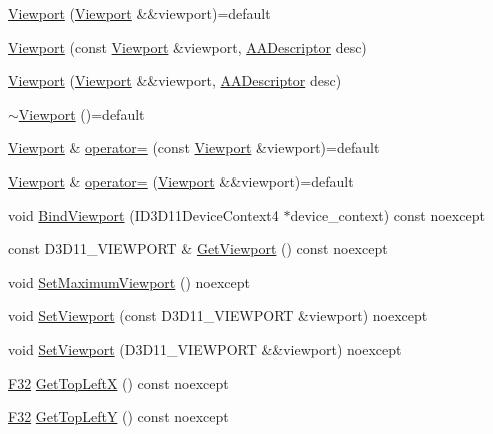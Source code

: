 \begin{DoxyCompactItemize}
\item 
\hyperlink{classmage_1_1_viewport_a314686e3b925a4158418a98ba28c4fc6}{Viewport} (\hyperlink{classmage_1_1_viewport}{Viewport} \&\&viewport)=default
\item 
\hyperlink{classmage_1_1_viewport_a31a85c06722097bf1bc0e6ead39e2e8d}{Viewport} (const \hyperlink{classmage_1_1_viewport}{Viewport} \&viewport, \hyperlink{namespacemage_a86cd40b8f2f42ca4d616cc6ec665a7f2}{A\+A\+Descriptor} desc)
\item 
\hyperlink{classmage_1_1_viewport_a61d8b17ff42b3d78d3b5e9eebff13496}{Viewport} (\hyperlink{classmage_1_1_viewport}{Viewport} \&\&viewport, \hyperlink{namespacemage_a86cd40b8f2f42ca4d616cc6ec665a7f2}{A\+A\+Descriptor} desc)
\item 
\hyperlink{classmage_1_1_viewport_a6fcf68e154b186d5c6241c495cc93fe5}{$\sim$\+Viewport} ()=default
\item 
\hyperlink{classmage_1_1_viewport}{Viewport} \& \hyperlink{classmage_1_1_viewport_ab06320c545dd9b71d17e7f8c92fb693c}{operator=} (const \hyperlink{classmage_1_1_viewport}{Viewport} \&viewport)=default
\item 
\hyperlink{classmage_1_1_viewport}{Viewport} \& \hyperlink{classmage_1_1_viewport_a83ef22f5db0991bc540372d37905524d}{operator=} (\hyperlink{classmage_1_1_viewport}{Viewport} \&\&viewport)=default
\item 
void \hyperlink{classmage_1_1_viewport_a363d750cdb8c21ee5b3e68a323f914db}{Bind\+Viewport} (I\+D3\+D11\+Device\+Context4 $\ast$device\+\_\+context) const noexcept
\item 
const D3\+D11\+\_\+\+V\+I\+E\+W\+P\+O\+RT \& \hyperlink{classmage_1_1_viewport_ad4bb75cdfbd137182898caad913de4d1}{Get\+Viewport} () const noexcept
\item 
void \hyperlink{classmage_1_1_viewport_a5af006b8ec0464a924c3822265727ee2}{Set\+Maximum\+Viewport} () noexcept
\item 
void \hyperlink{classmage_1_1_viewport_a12a0d7b74ce81786e38f08d399acafc6}{Set\+Viewport} (const D3\+D11\+\_\+\+V\+I\+E\+W\+P\+O\+RT \&viewport) noexcept
\item 
void \hyperlink{classmage_1_1_viewport_a12c41f937452bb1897558f0126947b22}{Set\+Viewport} (D3\+D11\+\_\+\+V\+I\+E\+W\+P\+O\+RT \&\&viewport) noexcept
\item 
\hyperlink{namespacemage_aa97e833b45f06d60a0a9c4fc22ae02c0}{F32} \hyperlink{classmage_1_1_viewport_a8ca949f032906839c8cf4ab6018bb2ba}{Get\+Top\+LeftX} () const noexcept
\item 
\hyperlink{namespacemage_aa97e833b45f06d60a0a9c4fc22ae02c0}{F32} \hyperlink{classmage_1_1_viewport_a9d1ddb340c775c3652c816c551653d69}{Get\+Top\+LeftY} () const noexcept

\end{DoxyCompactItemize}
